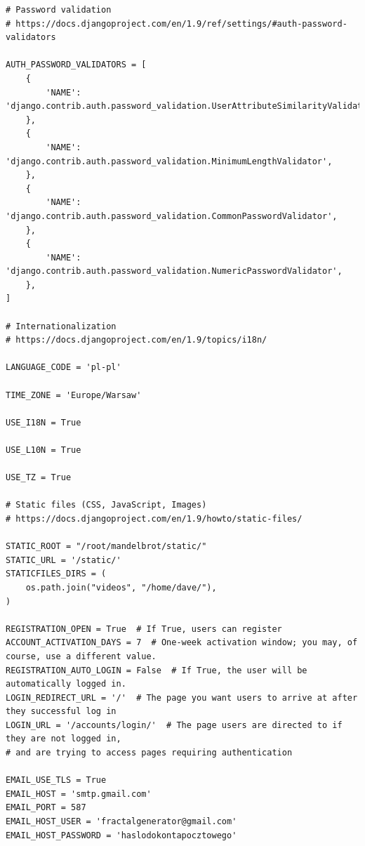 \documentclass[a4paper]{article}
\begin{document}
\begin{lstlisting}
# Password validation
# https://docs.djangoproject.com/en/1.9/ref/settings/#auth-password-validators

AUTH_PASSWORD_VALIDATORS = [
    {
        'NAME': 'django.contrib.auth.password_validation.UserAttributeSimilarityValidator',
    },
    {
        'NAME': 'django.contrib.auth.password_validation.MinimumLengthValidator',
    },
    {
        'NAME': 'django.contrib.auth.password_validation.CommonPasswordValidator',
    },
    {
        'NAME': 'django.contrib.auth.password_validation.NumericPasswordValidator',
    },
]

# Internationalization
# https://docs.djangoproject.com/en/1.9/topics/i18n/

LANGUAGE_CODE = 'pl-pl'

TIME_ZONE = 'Europe/Warsaw'

USE_I18N = True

USE_L10N = True

USE_TZ = True

# Static files (CSS, JavaScript, Images)
# https://docs.djangoproject.com/en/1.9/howto/static-files/

STATIC_ROOT = "/root/mandelbrot/static/"
STATIC_URL = '/static/'
STATICFILES_DIRS = (
    os.path.join("videos", "/home/dave/"),
)

REGISTRATION_OPEN = True  # If True, users can register
ACCOUNT_ACTIVATION_DAYS = 7  # One-week activation window; you may, of course, use a different value.
REGISTRATION_AUTO_LOGIN = False  # If True, the user will be automatically logged in.
LOGIN_REDIRECT_URL = '/'  # The page you want users to arrive at after they successful log in
LOGIN_URL = '/accounts/login/'  # The page users are directed to if they are not logged in,
# and are trying to access pages requiring authentication

EMAIL_USE_TLS = True
EMAIL_HOST = 'smtp.gmail.com'
EMAIL_PORT = 587
EMAIL_HOST_USER = 'fractalgenerator@gmail.com'
EMAIL_HOST_PASSWORD = 'haslodokontapocztowego'
\end{lstlisting}
\end{document}
